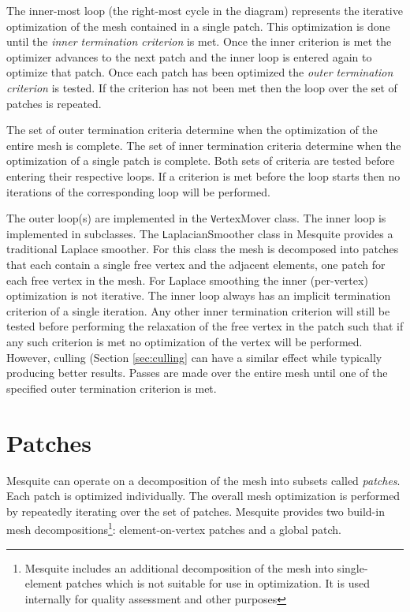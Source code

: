 The inner-most loop (the right-most cycle in the diagram) represents the iterative optimization of the mesh contained in a single patch.  This optimization is done until the {\em inner termination criterion} is met.  Once the inner criterion is met the optimizer advances to the next patch and the inner loop is entered again to optimize that patch.  Once each patch has been optimized the {\em outer termination criterion} is tested.  If the criterion has not been met then the loop over the set of patches is repeated.

The set of outer termination criteria determine when the optimization of the entire mesh is complete.  The set of inner termination criteria determine when the optimization of a single patch is complete.  Both sets of criteria are tested before entering their respective loops.  If a criterion is met before the loop starts then no iterations of the corresponding loop will be performed.

The outer loop(s) are implemented in the {\texttt VertexMover} class.  The inner loop is implemented in subclasses.  The {\texttt LaplacianSmoother} class in Mesquite provides a traditional Laplace smoother.  For this class the mesh is decomposed into patches that each contain a single free vertex and the adjacent elements, one patch for each free vertex in the mesh.  For Laplace smoothing the inner (per-vertex) optimization is not iterative.  The inner loop always has an implicit termination criterion of a single iteration.  Any other inner termination criterion will still be tested before performing the relaxation of the free vertex in the patch such that if any such criterion is met no optimization of the vertex will be performed.  However, culling (Section \ref{sec:culling} can have a similar effect while typically producing better results.  Passes are made over the entire mesh until one of the specified outer termination criterion is met.

\section{Patches \label{sec:patches}}


Mesquite can operate on a decomposition of the mesh into subsets called {\em patches}.  Each patch is optimized individually.  The overall mesh optimization is performed by repeatedly iterating over the set of patches.  Mesquite provides two build-in mesh decompositions\footnote{Mesquite includes an additional decomposition of the mesh into single-element patches which is not suitable for use in optimization.  It is used internally for quality assessment and other purposes}: element-on-vertex patches and a global patch.

